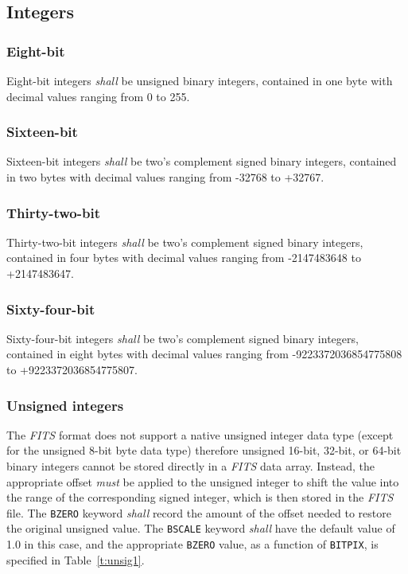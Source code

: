 \documentclass[onecolumn]{aa}
\begin{document}
  \subsection{Integers}
  
   \subsubsection{Eight-bit}
   Eight-bit integers {\em shall} be unsigned binary integers, contained 
   in one byte with decimal values ranging from 0 to 255.
  
   \subsubsection{Sixteen-bit}
   Sixteen-bit integers {\em shall} be two's complement
   signed binary
   integers, contained in two bytes with decimal values ranging from -32768 
   to +32767.


   \subsubsection{Thirty-two-bit}
   Thirty-two-bit integers {\em shall} be
   two's complement
   signed
   binary integers, contained in four
   bytes with decimal values ranging from -2147483648 
   to +2147483647. 

   \subsubsection{Sixty-four-bit}
   \label{s:sixtyfour}
   Sixty-four-bit integers {\em shall} be two's 
   complement signed binary integers, contained
   in eight
   bytes  with decimal values ranging from -9223372036854775808 to 
   +9223372036854775807. 

\subsubsection{Unsigned integers}
\label{s:Unsigned_Integers}

The {\em FITS\/} format does not support a native unsigned integer
data type (except for the unsigned 8-bit byte data type) therefore
unsigned 16-bit, 32-bit, or 64-bit binary integers cannot be
stored directly in a {\em FITS\/} data array.  
Instead, 
the appropriate offset {\em must} be applied to the unsigned integer
to shift the value into the range of the corresponding signed integer, which is
then stored in the {\em FITS\/} file.  The \verb+BZERO+ keyword {\em shall}
record the amount of the offset needed to restore the original
unsigned value.  The {\tt BSCALE} 
keyword {\em shall} have the default value of 1.0 in this case,
and the appropriate {\tt BZERO} value, as a function of {\tt BITPIX},
is specified in Table~\ref{t:unsig1}.
\end{document}
